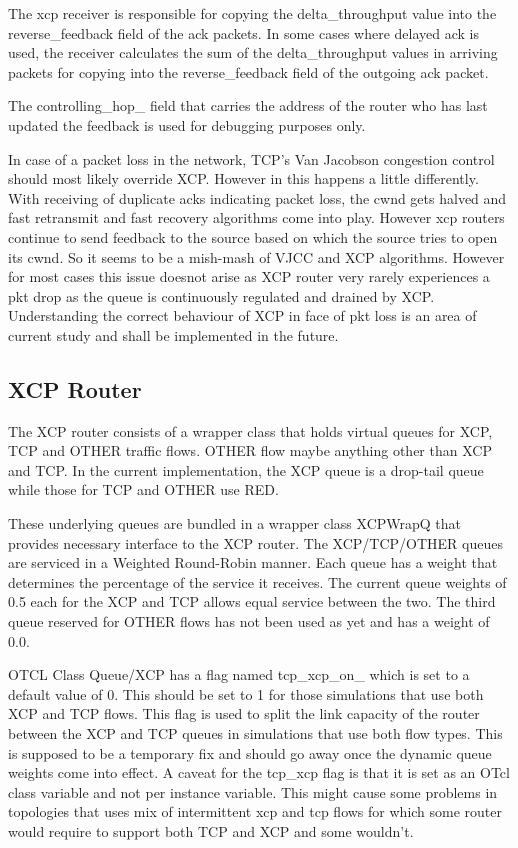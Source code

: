     The xcp receiver is responsible for copying the delta\_throughput
    value into the reverse\_feedback field of the ack packets. In some
    cases where delayed ack is used, the receiver calculates the sum of
    the delta\_throughput values in arriving packets for copying into the
    reverse\_feedback field of the outgoing ack packet.

    The controlling\_hop\_ field that carries the address of the router
    who has last updated the feedback is used for debugging purposes only.

    In case of a packet loss in the network, TCP's Van Jacobson
    congestion control should most likely override XCP.  However in \ns
    this happens 
    a little differently. With receiving of duplicate acks indicating
    packet loss, the cwnd gets halved and fast retransmit and fast
    recovery algorithms come into play. However xcp routers continue to send
    feedback to the source based on which the source tries to open its
    cwnd. So it seems to be a mish-mash of VJCC and XCP
    algorithms. However for most cases this issue doesnot arise as XCP
    router very rarely experiences a pkt drop as the queue is
    continuously regulated and drained by XCP. Understanding the correct
    behaviour of XCP in face of pkt loss is an area of current study and
    shall be implemented in the future. 

    \subsection{XCP Router}
    \label {sec:xcp_wrapper}
    The XCP router consists of a wrapper class that holds virtual queues
    for XCP, TCP and OTHER traffic flows. OTHER flow maybe anything other
    than XCP and TCP. In the current implementation, the XCP queue is a
    drop-tail queue while those for TCP and OTHER use RED. 

    These underlying queues are bundled in a
    wrapper class XCPWrapQ that provides necessary interface to the XCP
    router. The XCP/TCP/OTHER queues are serviced in a Weighted Round-Robin
    manner. Each queue has a weight that determines the percentage of the
    service it receives. The current queue weights of 0.5 each for the XCP
    and TCP allows equal service between the two. The third queue reserved
    for OTHER flows has not been used as yet and has a weight of 0.0. 
    
    OTCL Class Queue/XCP has a flag named tcp\_xcp\_on\_ which is set to
    a default 
    value of 0. This should be set to 1 for those simulations that use
    both XCP and TCP flows. This flag is used to split the link capacity
    of the router between the XCP and TCP queues in simulations that
    use both flow types. This is supposed to be a temporary fix and
    should go away once the dynamic queue weights come into effect. A
    caveat for the tcp\_xcp flag is that it is set as an OTcl class variable
    and not per instance variable. This might cause some 
    problems in topologies that uses mix of intermittent xcp and tcp
    flows for which some router would require to support both TCP and
    XCP and some wouldn't.
    
